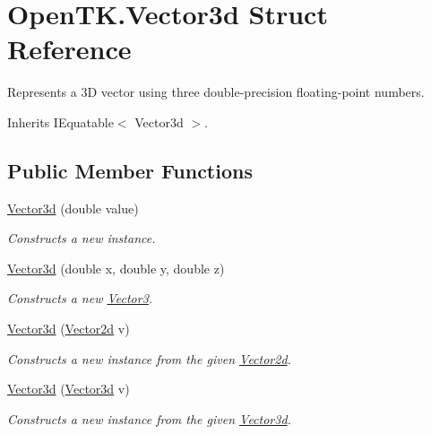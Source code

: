 \hypertarget{struct_open_t_k_1_1_vector3d}{\section{Open\-T\-K.\-Vector3d Struct Reference}
\label{struct_open_t_k_1_1_vector3d}
}


Represents a 3\-D vector using three double-\/precision floating-\/point numbers.  




Inherits I\-Equatable$<$ Vector3d $>$.

\subsection*{Public Member Functions}
\begin{DoxyCompactItemize}
\item 
\hyperlink{struct_open_t_k_1_1_vector3d_a02358e64cb6d3d31799125c1d24cb294}{Vector3d} (double value)
\begin{DoxyCompactList}\small\item\em Constructs a new instance. \end{DoxyCompactList}\item 
\hyperlink{struct_open_t_k_1_1_vector3d_aa606a775cb7818232c511ef06af38565}{Vector3d} (double x, double y, double z)
\begin{DoxyCompactList}\small\item\em Constructs a new \hyperlink{struct_open_t_k_1_1_vector3}{Vector3}. \end{DoxyCompactList}\item 
\hyperlink{struct_open_t_k_1_1_vector3d_a2286933384d774b643611fcb15426cc0}{Vector3d} (\hyperlink{struct_open_t_k_1_1_vector2d}{Vector2d} v)
\begin{DoxyCompactList}\small\item\em Constructs a new instance from the given \hyperlink{struct_open_t_k_1_1_vector2d}{Vector2d}. \end{DoxyCompactList}\item 
\hyperlink{struct_open_t_k_1_1_vector3d_ac82e74577ed1b8c3483c4fc497ab6e8c}{Vector3d} (\hyperlink{struct_open_t_k_1_1_vector3d}{Vector3d} v)
\begin{DoxyCompactList}\small\item\em Constructs a new instance from the given \hyperlink{struct_open_t_k_1_1_vector3d}{Vector3d}. \end{DoxyCompactList}\item 

\end{DoxyCompactItemize}
